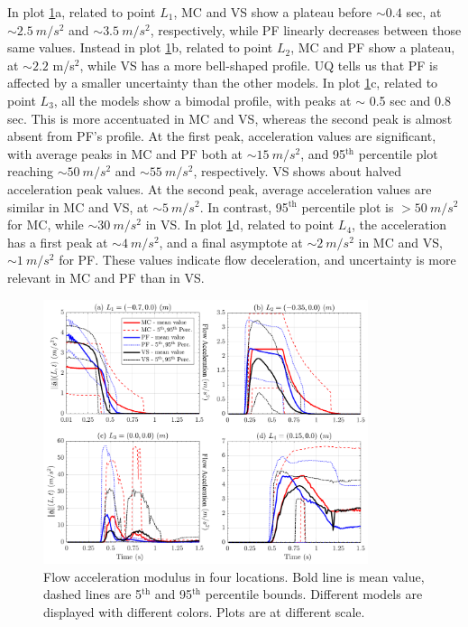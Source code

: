\documentclass{article}
\begin{document}
In plot \ref{fig:Ramp-AccL}a, related to point $L_1$, MC and VS show a plateau before $\sim 0.4$ sec, at $\sim 2.5 \ m/s^2$ and $\sim 3.5 \ m/s^2$, respectively, while PF linearly decreases between those same values. Instead in plot \ref{fig:Ramp-AccL}b, related to point $L_2$, MC and PF show a plateau, at $\sim 2.2$ m/s$^2$, while VS has a more bell-shaped profile. UQ tells us that PF is affected by a smaller uncertainty than the other models. In plot \ref{fig:Ramp-AccL}c, related to point $L_3$, all the models show a bimodal profile, with peaks at $\sim$ 0.5 sec and 0.8 sec. This is more accentuated in MC and VS, whereas the second peak is almost absent from PF's profile. At the first peak, acceleration values are significant, with average peaks in MC and PF both at $\sim 15 \ m/s^2$, and 95$^{\mathrm{th}}$ percentile plot reaching $\sim 50 \ m/s^2$ and $\sim 55 \ m/s^2$, respectively. VS shows about halved acceleration peak values. At the second peak, average acceleration values are similar in MC and VS, at $\sim 5 \ m/s^2$. In contrast, 95$^{\mathrm{th}}$ percentile plot is $> 50 \ m/s^2$ for MC, while $\sim 30 \ m/s^2$ in VS. In plot \ref{fig:Ramp-AccL}d, related to point $L_4$, the acceleration has a first peak at $\sim 4 \ m/s^2$, and a final asymptote at $\sim 2 \ m/s^2$ in MC and VS, $\sim 1 \ m/s^2$ for PF. These values indicate flow deceleration, and uncertainty is more relevant in MC and PF than in VS.
\begin{figure}[H]
         \centering
        \includegraphics[width=0.85\textwidth]{figures/incline/Acceleration.png}
        \caption{Flow acceleration modulus in four locations. Bold line is mean value, dashed lines are 5$^{\mathrm{th}}$ and 95$^{\mathrm{th}}$ percentile bounds. Different models are displayed with different colors. Plots are at different scale.}
        \label{fig:Ramp-AccL}
\end{figure}
\end{document}
